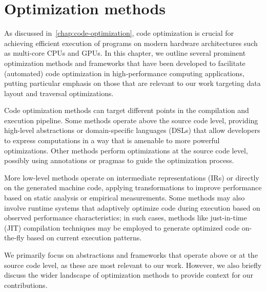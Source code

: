\chapter{Optimization methods}\label{chap:optimization-methods}


As discussed in~\cref{chap:code-optimization}, code optimization is crucial for achieving efficient execution of programs on modern hardware architectures such as multi-core CPUs and GPUs. In this chapter, we outline several prominent optimization methods and frameworks that have been developed to facilitate (automated) code optimization in high-performance computing applications, putting particular emphasis on those that are relevant to our work targeting data layout and traversal optimizations.

Code optimization methods can target different points in the compilation and execution pipeline. Some methods operate above the source code level, providing high-level abstractions or domain-specific languages (DSLs) that allow developers to express computations in a way that is amenable to more powerful optimizations. Other methods perform optimizations at the source code level, possibly using annotations or pragmas to guide the optimization process.

More low-level methods operate on intermediate representations (IRs) or directly on the generated machine code, applying transformations to improve performance based on static analysis or empirical measurements. Some methods may also involve runtime systems that adaptively optimize code during execution based on observed performance characteristics; in such cases, methods like just-in-time (JIT) compilation techniques may be employed to generate optimized code on-the-fly based on current execution patterns.

We primarily focus on abstractions and frameworks that operate above or at the source code level, as these are most relevant to our work. However, we also briefly discuss the wider landscape of optimization methods to provide context for our contributions.


